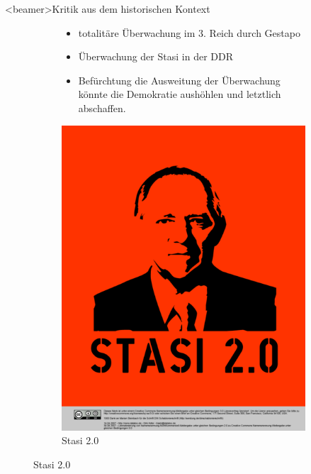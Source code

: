     \begin{frame}<beamer>{Kritik aus dem historischen Kontext}
      \begin{figure}
        \begin{subfigure}[b]{0.5\textwidth}
          \begin{itemize}
            \item totalitäre Überwachung im 3. Reich durch Gestapo
            \item Überwachung der Stasi in der DDR 
            \item Befürchtung die Ausweitung der Überwachung könnte die Demokratie aushöhlen und letztlich abschaffen.
          \end{itemize}
        \end{subfigure}
        \begin{subfigure}[b]{0.3\textwidth}
          \includegraphics[scale=0.2]{sections/img/stasi.png}
          \caption{Stasi 2.0}
          \label{fig:stasi}
        \end{subfigure}
      \end{figure}
    \end{frame}
